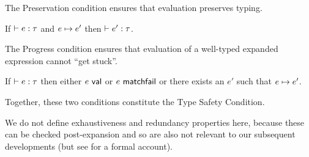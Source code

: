 {{{{The Preservation condition ensures that evaluation preserves typing.
\begin{condition}[Preservation]\label{condition:preservation-UP} If $\vdash e : \tau$ and $e \mapsto e'$ then $\vdash e' : \tau$. \end{condition}
The Progress condition ensures that evaluation of a well-typed expanded expression cannot ``get stuck''.
\begin{condition}[Progress]\label{condition:progress-UP} If $\vdash e : \tau$ then either $e~\mathsf{val}$ or $e~\mathsf{matchfail}$ or there exists an $e'$ such that $e \mapsto e'$. \end{condition}
 
Together, these two conditions constitute the Type Safety Condition.

We do not define exhaustiveness and redundancy properties here, because these can be checked post-expansion and so are also not relevant to our subsequent developments (but see \cite{pfple1} for a formal account).

}}}}
